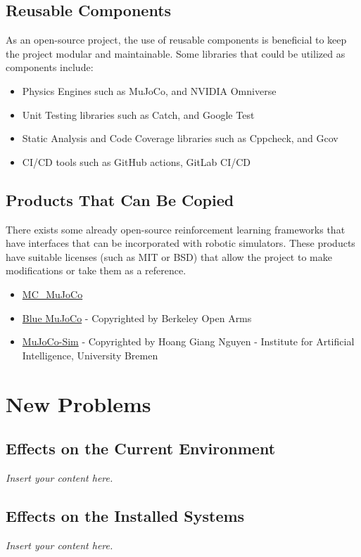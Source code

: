 \documentclass[12pt]{article}
\newcommand{\lips}{\textit{Insert your content here.}}
\begin{document}
\subsection{Reusable Components}
As an open-source project, the use of reusable components is beneficial to keep the project modular and maintainable. Some libraries that could be utilized as components include:
\begin{itemize}
  \item Physics Engines such as MuJoCo, and NVIDIA Omniverse
  \item Unit Testing libraries such as Catch, and Google Test
  \item Static Analysis and Code Coverage libraries such as Cppcheck, and Gcov
  \item CI/CD tools such as GitHub actions, GitLab CI/CD
\end{itemize}

\subsection{Products That Can Be Copied}
There exists some already open-source reinforcement learning frameworks that have interfaces that can be incorporated with robotic simulators. These products have suitable licenses (such as MIT or BSD) that allow the project to make modifications or take them as a reference.
\begin{itemize}
  \item \href{https://github.com/rohanpsingh/mc\_mujoco}{MC\_MuJoCo}
  \item \href{https://github.com/berkeleyopenarms/blue_mujoco_v1?tab=readme-ov-file}{Blue MuJoCo} - Copyrighted by Berkeley Open Arms
  \item \href{https://github.com/HoangGiang93/mujoco_sim?tab=readme-ov-file}{MuJoCo-Sim} - Copyrighted by Hoang Giang Nguyen - Institute for Artificial Intelligence, University Bremen
\end{itemize}
\section{New Problems}
\subsection{Effects on the Current Environment}
\lips
\subsection{Effects on the Installed Systems}
\lips
\end{document}
